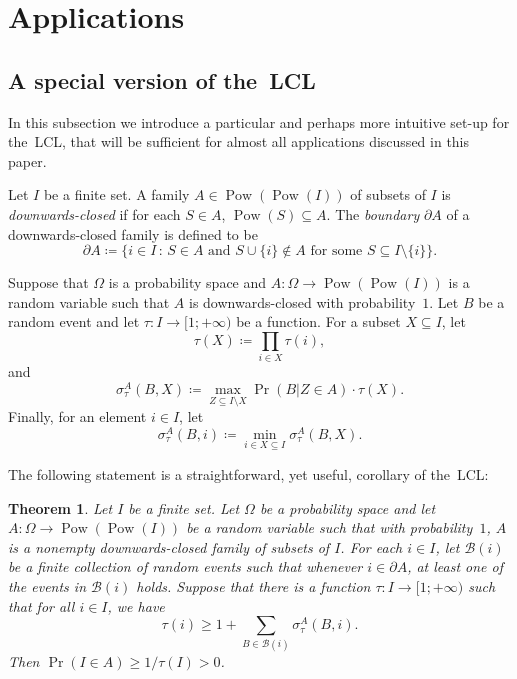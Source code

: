 \documentclass[10pt]{article}
\numberwithin{equation}{subsection}
\newtheorem{theo}{Theorem}[section]
\theoremstyle{definition}
\newcommand{\powerset}[1]{\operatorname{Pow}(#1)}
\begin{document}
	\section{Applications}\label{sec:applications}
	
	\subsection{A special version of the~LCL}\label{subsec:special}
	
	In this subsection we introduce a particular and perhaps more intuitive set-up for the~LCL, that will be sufficient for almost all applications discussed in this paper.
	
	Let $I$ be a finite set. A family $A \in \powerset{\powerset{I}}$ of subsets of $I$ is \emph{downwards-closed} if for each $S \in A$, $\powerset{S} \subseteq A$. The \emph{boundary} $\partial A$ of a downwards-closed family is defined to be
	$$
	\partial A \coloneqq \{i \in I \,:\, S \in A \text{ and } S \cup \{i\} \not \in A \text{ for some } S \subseteq I \setminus \{i\}\}.
	$$
	
	Suppose that $\Omega$ is a probability space and $A \colon \Omega \to \powerset{\powerset{I}}$ is a random variable such that $A$ is downwards-closed with probability~$1$. Let $B$ be a random event and let $\tau \colon I \to [1;+\infty)$ be a function. For a subset $X \subseteq I$, let
	$$
		\tau(X) \coloneqq \prod_{i \in X} \tau(i),
	$$
	and
	$$
	\sigma^A_\tau(B, X) \coloneqq \max_{Z \subseteq I \setminus X} \Pr(B \vert Z \in A) \cdot \tau(X).
	$$
	Finally, for an element $i \in I$, let
	$$
	\sigma^A_\tau(B, i) \coloneqq \min_{i \in X \subseteq I} \sigma^A_\tau(B, X).
	$$
	
	The following statement is a straightforward, yet useful, corollary of the~LCL:
	
	\begin{theo}\label{theo:hypercubes}
		Let $I$ be a finite set. Let $\Omega$ be a probability space and let $A \colon \Omega \to \powerset{\powerset{I}}$ be a random variable such that with probability~$1$, $A$ is a nonempty downwards-closed family of subsets of $I$. For each $i \in I$, let $\mathcal{B}(i)$ be a finite collection of random events such that whenever $i \in \partial A$, at least one of the events in $\mathcal{B}(i)$ holds. Suppose that there is a function $\tau \colon I \to [1;+\infty)$ such that for all $i \in I$, we have
		\begin{equation}\label{eq:special_main}
		\tau(i) \geq 1 + \sum_{B \in \mathcal{B}(i)} \sigma^A_\tau(B, i).
		\end{equation}
		Then $\Pr(I \in A) \geq 1/\tau(I) > 0$.
	\end{theo}
	
\end{document}
